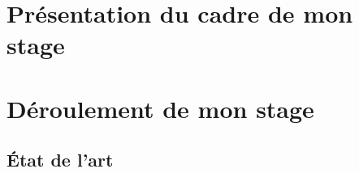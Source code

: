




\begin{abstract}
%  
\end{abstract}

\tableofcontents

%



\part{Présentation du cadre de mon stage}

%

\part{Déroulement de mon stage}


\chapter{État de l'art}

